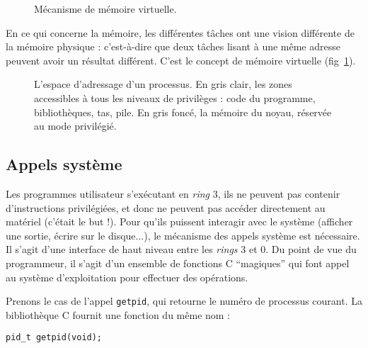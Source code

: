 \begin{figure}
\centering
{}
\caption{Mécanisme de mémoire virtuelle.}
\label{fig:memoire-virtuelle}
\end{figure}

En ce qui concerne la mémoire, les différentes tâches ont une vision différente
de la mémoire physique : c'est-à-dire que deux tâches lisant à une même adresse
peuvent avoir un résultat différent. C'est le concept de mémoire virtuelle
(fig~\ref{fig:memoire-virtuelle}).

\begin{figure}
\centering
\fbox{
  
}

\caption{L'espace d'adressage d'un processus. En gris clair, les zones
accessibles à tous les niveaux de privilèges : code du programme, bibliothèques,
tas, pile. En gris foncé, la mémoire du noyau, réservée au mode privilégié.}

\label{fig:memmap}
\end{figure}

\subsection{Appels système}

Les programmes utilisateur s'exécutant en \emph{ring} 3, ils ne peuvent pas
contenir d'instructions privilégiées, et donc ne peuvent pas accéder directement
au matériel (c'était le but !). Pour qu'ils puissent interagir avec le système
(afficher une sortie, écrire sur le disque...), le mécanisme des appels système
est nécessaire. Il s'agit d'une interface de haut niveau entre les \emph{rings}
3 et 0. Du point de vue du programmeur, il s'agit d'un ensemble de fonctions C
``magiques'' qui font appel au système d'exploitation pour effectuer des
opérations.

Prenons le cas de l'appel \texttt{getpid}, qui retourne le numéro de processus
courant. La bibliothèque C fournit une fonction du même nom :

\begin{Verbatim}
pid_t getpid(void);
\end{Verbatim}

